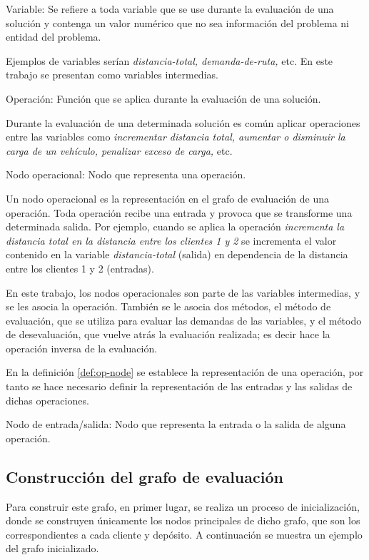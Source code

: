   \begin{defn}
	Variable: Se refiere a toda variable que se use durante la evaluación de una solución y contenga un valor numérico que no sea información del problema ni entidad del problema.
  \end{defn}
  Ejemplos de variables serían \textit{distancia-total, demanda-de-ruta, }etc. En este trabajo se presentan como variables intermedias.


  \begin{defn}
	  Operación: Función que se aplica durante la evaluación de una solución.
  \end{defn}
  
  Durante la evaluación de una determinada solución es común aplicar operaciones entre las variables como \textit{incrementar distancia total, aumentar o disminuir la carga de un vehículo, penalizar exceso de carga,
  }etc.
  
  \begin{defn} \label{def:op-node}
	  Nodo operacional: Nodo que representa una operación.
  \end{defn}
  
  Un nodo operacional es la representación en el grafo de evaluación de una operación. Toda operación recibe una entrada y
  provoca que se transforme  una determinada salida. Por ejemplo, cuando se aplica la operación \textit{incrementa la distancia total en la distancia entre los clientes 1 y 2}
  se incrementa el valor contenido en la variable \textit{distancia-total} (salida) en dependencia de la distancia entre los clientes 1 y 2 (entradas).
  
 En este trabajo, los nodos operacionales son parte de las variables intermedias, y se les asocia la operación. También se le asocia dos métodos, el método de evaluación, que se utiliza para evaluar las demandas de las variables, y el método de desevaluación, que vuelve atrás la evaluación realizada; es decir hace la operación inversa de la evaluación.

  En la definición \ref{def:op-node} se establece la representación de una operación, por tanto se hace necesario definir la representación de las entradas y las salidas de dichas
  operaciones.
  
  \begin{defn}
	  Nodo de entrada/salida: Nodo que representa la entrada o la salida de alguna operación.
  \end{defn}
\subsection*{Construcción del grafo de evaluación}
Para construir este grafo, en primer lugar, se realiza un proceso de inicialización, donde se construyen únicamente los nodos principales de dicho grafo, que son los correspondientes a cada cliente y depósito. A continuación se muestra un ejemplo del grafo inicializado.

